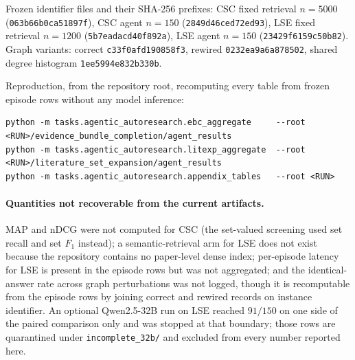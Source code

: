 Frozen identifier files and their SHA-256 prefixes: CSC fixed retrieval
$n{=}5000$ (\texttt{063b66b0ca51897f}), CSC agent $n{=}150$ (\texttt{2849d46ced72ed93}), LSE fixed
retrieval $n{=}1200$ (\texttt{5b7eadacd40f892a}), LSE agent $n{=}150$ (\texttt{23429f6159c50b82}).
Graph variants: correct \texttt{c33f0afd190858f3}, rewired \texttt{0232ea9a6a878502}, shared degree
histogram \texttt{1ee5994e832b330b}.

Reproduction, from the repository root, recomputing every table from frozen episode rows without
any model inference:

\begin{verbatim}
python -m tasks.agentic_autoresearch.ebc_aggregate     --root <RUN>/evidence_bundle_completion/agent_results
python -m tasks.agentic_autoresearch.litexp_aggregate  --root <RUN>/literature_set_expansion/agent_results
python -m tasks.agentic_autoresearch.appendix_tables   --root <RUN>
\end{verbatim}

\paragraph{Quantities not recoverable from the current artifacts.} MAP and nDCG were not computed
for CSC (the set-valued screening used set recall and set $F_1$ instead); a semantic-retrieval arm
for LSE does not exist because the repository contains no paper-level dense index; per-episode
latency for LSE is present in the episode rows but was not aggregated; and the identical-answer rate
across graph perturbations was not logged, though it is recomputable from the episode rows by
joining correct and rewired records on instance identifier. An optional Qwen2.5-32B run on LSE
reached $91/150$ on one side of the paired comparison only and was stopped at that boundary; those
rows are quarantined under \texttt{incomplete\_32b/} and excluded from every number reported here.
